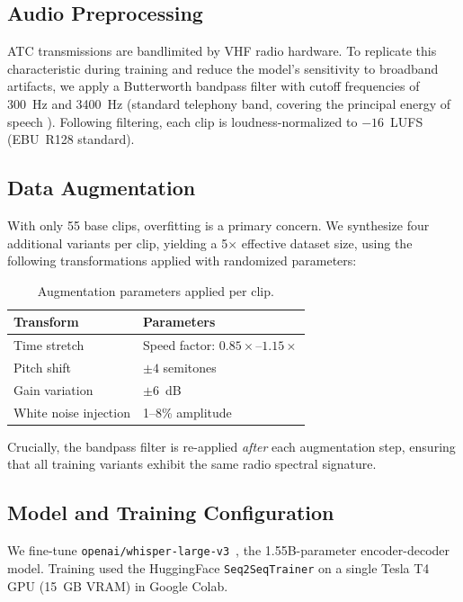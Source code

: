 \documentclass[11pt,a4paper]{article}
\begin{document}
\subsection{Audio Preprocessing}
\label{sec:preprocess}

ATC transmissions are bandlimited by VHF radio hardware.
To replicate this characteristic during training and reduce the model's
sensitivity to broadband artifacts, we apply a Butterworth bandpass filter
with cutoff frequencies of 300~Hz and 3400~Hz (standard telephony band,
covering the principal energy of speech \cite{shannon1948communication}).
Following filtering, each clip is loudness-normalized to $-16$~LUFS
(EBU~R128 standard).

\subsection{Data Augmentation}
\label{sec:augmentation}

With only 55 base clips, overfitting is a primary concern.
We synthesize four additional variants per clip, yielding a 5$\times$ effective
dataset size, using the following transformations applied with randomized
parameters:

\begin{table}[h]
\centering
\caption{Augmentation parameters applied per clip.}
\begin{tabular}{ll}
\toprule
\textbf{Transform} & \textbf{Parameters} \\
\midrule
Time stretch        & Speed factor: $0.85\times$--$1.15\times$ \\
Pitch shift         & $\pm 4$ semitones \\
Gain variation      & $\pm 6$~dB \\
White noise injection & 1--8\% amplitude \\
\bottomrule
\end{tabular}
\end{table}

Crucially, the bandpass filter is re-applied \textit{after} each augmentation
step, ensuring that all training variants exhibit the same radio spectral
signature.

\subsection{Model and Training Configuration}

We fine-tune \texttt{openai/whisper-large-v3}~\cite{radford2023whisper},
the 1.55B-parameter encoder-decoder model.
Training used the HuggingFace \texttt{Seq2SeqTrainer} on a single Tesla T4
GPU (15~GB VRAM) in Google Colab.
\end{document}
